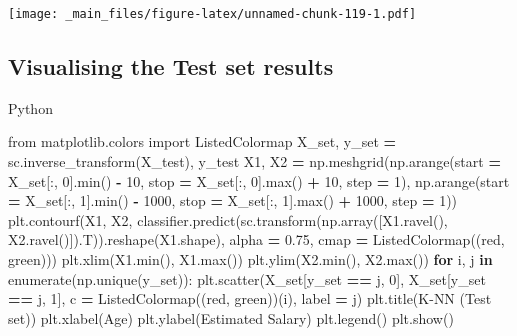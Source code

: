 \documentclass[
]{book}
\newenvironment{Shaded}{\begin{snugshade}}{\end{snugshade}}
\newcommand{\BuiltInTok}[1]{#1}
\newcommand{\ControlFlowTok}[1]{\textcolor[rgb]{0.13,0.29,0.53}{\textbf{#1}}}
\newcommand{\DecValTok}[1]{\textcolor[rgb]{0.00,0.00,0.81}{#1}}
\newcommand{\FloatTok}[1]{\textcolor[rgb]{0.00,0.00,0.81}{#1}}
\newcommand{\ImportTok}[1]{#1}
\newcommand{\KeywordTok}[1]{\textcolor[rgb]{0.13,0.29,0.53}{\textbf{#1}}}
\newcommand{\NormalTok}[1]{#1}
\newcommand{\OperatorTok}[1]{\textcolor[rgb]{0.81,0.36,0.00}{\textbf{#1}}}
\newcommand{\StringTok}[1]{\textcolor[rgb]{0.31,0.60,0.02}{#1}}
\theoremstyle{definition}
\theoremstyle{definition}
\theoremstyle{definition}
\theoremstyle{definition}
\theoremstyle{remark}
\begin{document}
\texttt{[image: \_main\_files/figure-latex/unnamed-chunk-119-1.pdf]}

\hypertarget{visualising-the-test-set-results-2}{%
\subsection{Visualising the Test set results}\label{visualising-the-test-set-results-2}}

Python

\begin{Shaded}
\begin{Highlighting}[]
\ImportTok{from}\NormalTok{ matplotlib.colors }\ImportTok{import}\NormalTok{ ListedColormap}
\NormalTok{X\_set, y\_set }\OperatorTok{=}\NormalTok{ sc.inverse\_transform(X\_test), y\_test}
\NormalTok{X1, X2 }\OperatorTok{=}\NormalTok{ np.meshgrid(np.arange(start }\OperatorTok{=}\NormalTok{ X\_set[:, }\DecValTok{0}\NormalTok{].}\BuiltInTok{min}\NormalTok{() }\OperatorTok{{-}} \DecValTok{10}\NormalTok{, stop }\OperatorTok{=}\NormalTok{ X\_set[:, }\DecValTok{0}\NormalTok{].}\BuiltInTok{max}\NormalTok{() }\OperatorTok{+} \DecValTok{10}\NormalTok{, step }\OperatorTok{=} \DecValTok{1}\NormalTok{),}
\NormalTok{                     np.arange(start }\OperatorTok{=}\NormalTok{ X\_set[:, }\DecValTok{1}\NormalTok{].}\BuiltInTok{min}\NormalTok{() }\OperatorTok{{-}} \DecValTok{1000}\NormalTok{, stop }\OperatorTok{=}\NormalTok{ X\_set[:, }\DecValTok{1}\NormalTok{].}\BuiltInTok{max}\NormalTok{() }\OperatorTok{+} \DecValTok{1000}\NormalTok{, step }\OperatorTok{=} \DecValTok{1}\NormalTok{))}
\NormalTok{plt.contourf(X1, X2, classifier.predict(sc.transform(np.array([X1.ravel(), X2.ravel()]).T)).reshape(X1.shape),}
\NormalTok{             alpha }\OperatorTok{=} \FloatTok{0.75}\NormalTok{, cmap }\OperatorTok{=}\NormalTok{ ListedColormap((}\StringTok{\textquotesingle{}red\textquotesingle{}}\NormalTok{, }\StringTok{\textquotesingle{}green\textquotesingle{}}\NormalTok{)))}
\NormalTok{plt.xlim(X1.}\BuiltInTok{min}\NormalTok{(), X1.}\BuiltInTok{max}\NormalTok{())}
\NormalTok{plt.ylim(X2.}\BuiltInTok{min}\NormalTok{(), X2.}\BuiltInTok{max}\NormalTok{())}
\ControlFlowTok{for}\NormalTok{ i, j }\KeywordTok{in} \BuiltInTok{enumerate}\NormalTok{(np.unique(y\_set)):}
\NormalTok{    plt.scatter(X\_set[y\_set }\OperatorTok{==}\NormalTok{ j, }\DecValTok{0}\NormalTok{], X\_set[y\_set }\OperatorTok{==}\NormalTok{ j, }\DecValTok{1}\NormalTok{], c }\OperatorTok{=}\NormalTok{ ListedColormap((}\StringTok{\textquotesingle{}red\textquotesingle{}}\NormalTok{, }\StringTok{\textquotesingle{}green\textquotesingle{}}\NormalTok{))(i), label }\OperatorTok{=}\NormalTok{ j)}
\NormalTok{plt.title(}\StringTok{\textquotesingle{}K{-}NN (Test set)\textquotesingle{}}\NormalTok{)}
\NormalTok{plt.xlabel(}\StringTok{\textquotesingle{}Age\textquotesingle{}}\NormalTok{)}
\NormalTok{plt.ylabel(}\StringTok{\textquotesingle{}Estimated Salary\textquotesingle{}}\NormalTok{)}
\NormalTok{plt.legend()}
\NormalTok{plt.show()}
\end{Highlighting}
\end{Shaded}
\end{document}
